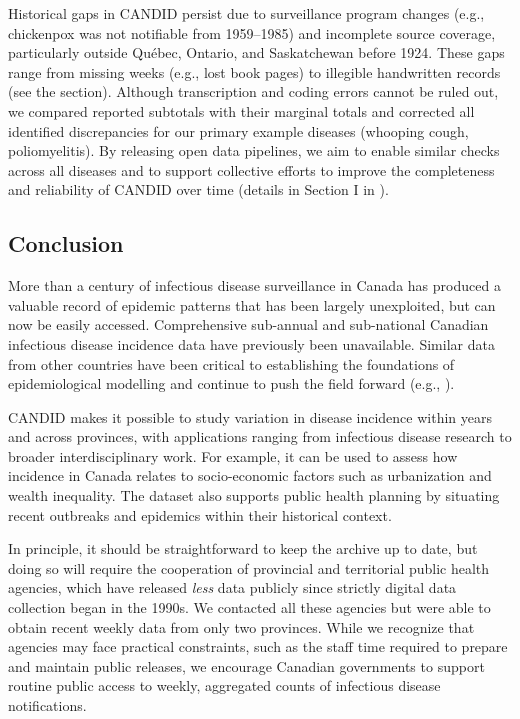 \documentclass[10pt,letterpaper]{article}
\begin{document}
Historical gaps in CANDID persist due to surveillance program changes (e.g., chickenpox was not notifiable from 1959--1985) and incomplete source coverage, particularly outside Québec, Ontario, and Saskatchewan before 1924. These gaps range from missing weeks (e.g., lost book pages) to illegible handwritten records (see the  section). Although transcription and coding errors cannot be ruled out, we compared reported subtotals with their marginal totals and corrected all identified discrepancies for our primary example diseases (whooping cough, poliomyelitis). By releasing open data pipelines, we aim to enable similar checks across all diseases and to support collective efforts to improve the completeness and reliability of CANDID over time (details in Section I in ).

\subsection*{Conclusion}

More than a century of infectious disease surveillance in Canada has produced a valuable record of epidemic patterns that has been largely unexploited, but can now be easily accessed. Comprehensive sub-annual and sub-national Canadian infectious disease incidence data have previously been unavailable. Similar data from other countries have been critical to establishing the foundations of epidemiological modelling and continue to push the field forward (e.g., \cite{bartlett1960critical,london1973recurrent,anderson1982directly,fine1982measles,grenfell1985pertussis,AndeMay91,Tien+11,KrylEarn20,Earn+20}).

CANDID makes it possible to study variation in disease incidence within years and across provinces, with applications ranging from infectious disease research to broader interdisciplinary work. For example, it can be used to assess how incidence in Canada relates to socio-economic factors such as urbanization and wealth inequality. The dataset also supports public health planning by situating recent outbreaks and epidemics within their historical context.

In principle, it should be straightforward to keep the archive up to date, but doing so will require the cooperation of provincial and territorial public health agencies, which have released \emph{less} data publicly since strictly digital data collection began in the 1990s. We contacted all these agencies but were able to obtain recent weekly data from only two provinces. While we recognize that agencies may face practical constraints, such as the staff time required to prepare and maintain public releases, we encourage Canadian governments to support routine public access to weekly, aggregated counts of infectious disease notifications.
\end{document}
